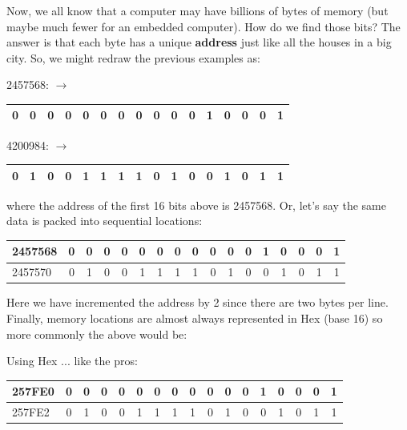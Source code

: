 Now, we all know that a computer may have billions of bytes of memory (but maybe much fewer
for an embedded computer).   How do we find those bits?  The answer is that each 
byte has a unique {\bf address} just like all the houses in a big city.   So, we might redraw the previous 
examples as:




\vspace{0.1in}
2457568: $\to$ \begin{tabular}{|c|c|c|c|c|c|c|c|c|c|c|c|c|c|c|c|}\hline
0&0&0&0&0&0&0&0&0&0&0&1&0&0&0&1\\\hline
\end{tabular}
\vspace{0.1in}

4200984: $\to$ \begin{tabular}{|c|c|c|c|c|c|c|c|c|c|c|c|c|c|c|c|}\hline
0&1&0&0 & 1&1&1&1 & 0&1&0&0 & 1&0&1&1\\\hline
\end{tabular}
\vspace{0.1in}

where the address of the first 16 bits above is 2457568.  Or,
let's say the same data is packed into sequential locations:

\vspace{0.1in}
\begin{tabular}{l|c|c|c|c|c|c|c|c|c|c|c|c|c|c|c|c|}\hline
2457568& 0&0&0&0&0&0&0&0&0&0&0&1&0&0&0&1\\\hline
2457570& 0&1&0&0 & 1&1&1&1 & 0&1&0&0 & 1&0&1&1\\\hline
\end{tabular}
\vspace{0.1in}

Here we have incremented the address by 2 since there are two bytes per line. 
Finally, memory locations are almost always represented in Hex (base 16) so 
more commonly the above would be:

 Using Hex ... like the pros:

 \vspace{0.1in}

\begin{tabular}{l|c|c|c|c|c|c|c|c|c|c|c|c|c|c|c|c|}\hline
257FE0& 0&0&0&0&0&0&0&0&0&0&0&1&0&0&0&1\\\hline
257FE2& 0&1&0&0 & 1&1&1&1 & 0&1&0&0 & 1&0&1&1\\\hline
\end{tabular}
\vspace{0.1in}


